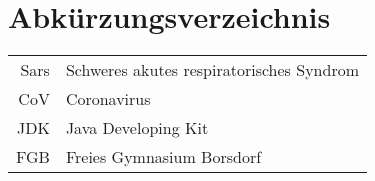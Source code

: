 \section{Abkürzungsverzeichnis}

\begin{tabular}{r|l}
    Sars&Schweres akutes respiratorisches Syndrom\\
    CoV&Coronavirus\\
    JDK&Java Developing Kit\\
    FGB&Freies Gymnasium Borsdorf\\
\end{tabular}